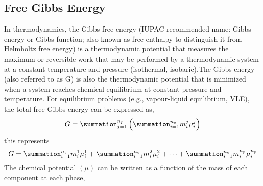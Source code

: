 \documentclass[12pt,a4paper,oneside]{report}%
\begin{document}
\subsection{Free Gibbs Energy}
In thermodynamics, the Gibbs free energy (IUPAC recommended name: Gibbs energy or Gibbs function; also known as free enthalpy to distinguish it from Helmholtz free energy) is a thermodynamic potential that measures the maximum or reversible work that may be performed by a thermodynamic system at a constant temperature and pressure (isothermal, isobaric).The Gibbs energy (also referred to as G) is also the thermodynamic potential that is minimized when a system reaches chemical equilibrium at constant pressure and temperature. For equilibrium problems (e.g., vapour-liquid equilibrium, VLE), the total free Gibbs energy can be expressed as,
\begin{equation}
G = \summation_{j=1}^{n_{p}}\left(\summation_{i=1}^{n_{c}} m_{i}^{j}\mu_{i}^{j}\right)
\label{MassGibbs_Definition}
\end{equation} 
this represents
\begin{displaymath}
G = \summation_{i=1}^{n_{c}} m_{i}^{1}\mu_{i}^{1} + \summation_{i=1}^{n_{c}} m_{i}^{2}\mu_{i}^{2} + \cdots + \summation_{i=1}^{n_{c}} m_{i}^{n_{p}}\mu_{i}^{n_{p}}
\end{displaymath}
The chemical potential $\left(\mu\right)$ can be written as a function of the mass of each component at each phase,
\end{document}
